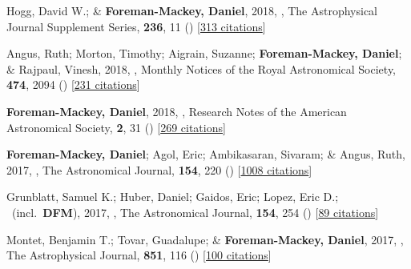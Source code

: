 \item[{\color{numcolor}\scriptsize34}] Hogg, David W.; \& \textbf{Foreman-Mackey, Daniel}, 2018, , The Astrophysical Journal Supplement Series, \textbf{236}, 11 () [\href{https://ui.adsabs.harvard.edu/abs/2018ApJS..236...11H}{313 citations}]

\item[{\color{numcolor}\scriptsize33}] Angus, Ruth; Morton, Timothy; Aigrain, Suzanne; \textbf{Foreman-Mackey, Daniel}; \& Rajpaul, Vinesh, 2018, , Monthly Notices of the Royal Astronomical Society, \textbf{474}, 2094 () [\href{https://ui.adsabs.harvard.edu/abs/2018MNRAS.474.2094A}{231 citations}]

\item[{\color{numcolor}\scriptsize32}] \textbf{Foreman-Mackey, Daniel}, 2018, , Research Notes of the American Astronomical Society, \textbf{2}, 31 () [\href{https://ui.adsabs.harvard.edu/abs/2018RNAAS...2...31F}{269 citations}]

\item[{\color{numcolor}\scriptsize31}] \textbf{Foreman-Mackey, Daniel}; Agol, Eric; Ambikasaran, Sivaram; \& Angus, Ruth, 2017, , The Astronomical Journal, \textbf{154}, 220 () [\href{https://ui.adsabs.harvard.edu/abs/2017AJ....154..220F}{1008 citations}]

\item[{\color{numcolor}\scriptsize30}] Grunblatt, Samuel K.; Huber, Daniel; Gaidos, Eric; Lopez, Eric D.; \etal\ (incl.\ \textbf{DFM}), 2017, , The Astronomical Journal, \textbf{154}, 254 () [\href{https://ui.adsabs.harvard.edu/abs/2017AJ....154..254G}{89 citations}]

\item[{\color{numcolor}\scriptsize29}] Montet, Benjamin T.; Tovar, Guadalupe; \& \textbf{Foreman-Mackey, Daniel}, 2017, , The Astrophysical Journal, \textbf{851}, 116 () [\href{https://ui.adsabs.harvard.edu/abs/2017ApJ...851..116M}{100 citations}]

